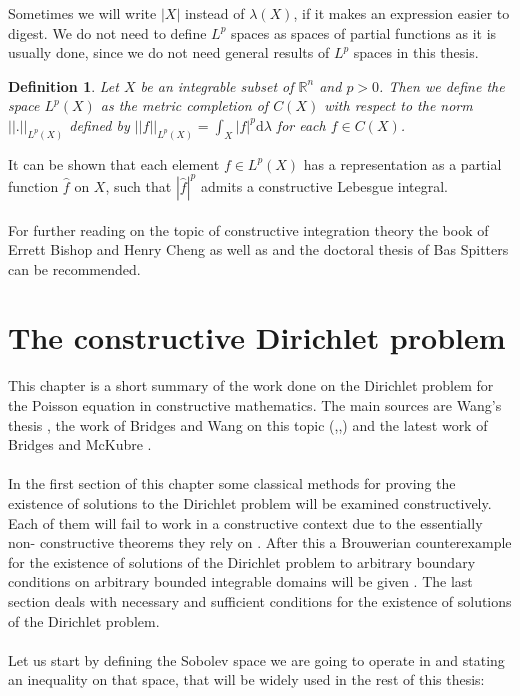 \documentclass[11pt,a4paper,leqno]{report}
\newtheorem{definition}[theorem]{Definition}
\numberwithin{equation}{chapter}
\begin{document}
Sometimes we will write $|X|$ instead of $\lambda(X)$, if it makes an expression easier to digest. We do not need to define $L^p$ spaces as spaces of partial functions as it is usually done, since we do not need general results of $L^p$ spaces in this thesis.
\begin{definition} Let $X$ be an integrable subset of $\mathbb{R}^n$ and $p>0$. Then we define the space $L^p(X)$ as the metric completion of $C(X)$ with respect to the norm $||.||_{L^p(X)}$ defined by $||f||_{L^p(X)}=\int_X |f|^p \mathrm{d}\lambda$ for each $f\in C(X)$.
\end{definition}
It can be shown that each element $f\in L^p(X)$ has a representation as a partial function $\hat{f}$ on $X$, such that $|\hat{f}|^p$ admits a constructive Lebesgue integral.\\
\\
For further reading on the topic of constructive integration theory the book of Errett Bishop and Henry Cheng \cite{CMT} as well as \cite{CANA} and the doctoral thesis of Bas Spitters \cite{CIF} can be recommended.
\chapter{The constructive Dirichlet problem}
This chapter is a short summary of the work done on the Dirichlet problem for the Poisson equation in constructive mathematics. The main sources are Wang's thesis \cite{Wang}, the work of Bridges and Wang on this topic (\cite{CADP},\cite{WSDP},\cite{CWSDP}) and the latest work of Bridges and McKubre \cite{SDPC}.\\
\\
In the first section of this chapter some classical methods for proving the existence of solutions to the Dirichlet problem will be examined constructively. Each of them will fail to work in a constructive context due to the essentially non- constructive theorems they rely on \cite{Wang}. After this a Brouwerian counterexample for the existence of solutions of the Dirichlet problem to arbitrary boundary conditions on arbitrary bounded integrable domains will be given \cite{SDPC}.
The last section deals with necessary and sufficient conditions for the existence of solutions of the Dirichlet problem.\\
\\
Let us start by defining the Sobolev space we are going to operate in and stating an inequality on that space, that will be widely used in the rest of this thesis:
\end{document}
